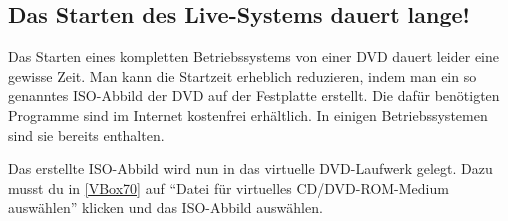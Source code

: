 \documentclass[a4paper,10pt,BCOR=0mm,DIV=14]{scrartcl}
\newcommand{\command}[1]{\textsf{\enquote{#1}}}
\begin{document}
\subsection{Das Starten des Live-Systems dauert lange!}
Das Starten eines kompletten Betriebssystems von einer DVD dauert leider eine gewisse Zeit. Man kann die Startzeit erheblich reduzieren, indem man ein so genanntes ISO-Abbild der DVD auf der Festplatte erstellt. Die dafür benötigten Programme sind im Internet kostenfrei erhältlich. In einigen Betriebssystemen sind sie bereits enthalten. 

Das erstellte ISO-Abbild wird nun in das virtuelle DVD-Laufwerk gelegt. Dazu musst du in \cref{VBox70} auf \command{Datei für virtuelles CD/DVD-ROM-Medium auswählen} klicken und das ISO-Abbild auswählen.
\end{document}
